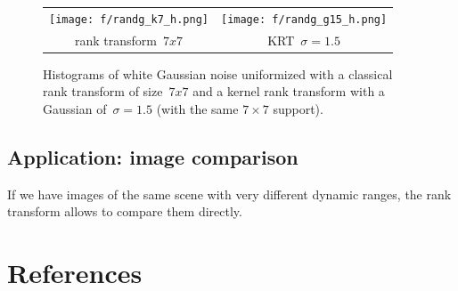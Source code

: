 \documentclass[12pt]{article}                  %
\begin{document}
\begin{figure}[p]
	\begin{tabular}{cc}
		\texttt{[image: f/randg\_k7\_h.png]} &
		\texttt{[image: f/randg\_g15\_h.png]} \\
		rank transform~$7x7$ &
		KRT~$\sigma=1.5$
	\end{tabular}
	\caption{\label{fig:histograms}
	Histograms of white Gaussian noise uniformized with a classical
	rank transform of size~$7x7$ and a kernel rank transform with a
	Gaussian of~$\sigma=1.5$ (with the same $7\times7$ support).
	}
\end{figure}


\subsection{Application: image comparison}

If we have images of the same scene with very different dynamic ranges, the
rank transform allows to compare them directly.   


\section{References}



\end{document}
